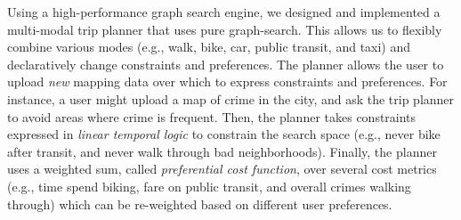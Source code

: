 \documentclass[letterpaper]{article}
\newcommand{\tit}[1]{\textit{#1}}
\begin{document}
Using a high-performance graph search
engine\cite{zhou2011dynamic}, we designed and implemented a 
multi-modal trip planner that uses pure
graph-search. This allows us to flexibly combine various modes
(e.g., walk, bike, car, public transit, and taxi) and 
declaratively change constraints and preferences. 
The planner allows the user
to upload \tit{new} mapping data over which to express
constraints and preferences.  For instance, a user might upload a map of crime
in the city, and ask the trip planner to avoid areas where crime is frequent.
Then, the planner takes constraints expressed in \tit{linear
temporal logic} to constrain the search space (e.g., never bike after
transit, and never walk through bad neighborhoods).
Finally, the planner uses a weighted sum, called \tit{preferential cost function}, 
over several cost metrics (e.g., time spend biking, fare on public transit, 
and overall crimes walking through) which can be re-weighted based
on different user preferences. 

\end{document}

